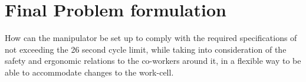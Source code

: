 \chapter{Final Problem formulation} \label{ch:finalprob}
 
 
 How can the manipulator be set up to comply with the required specifications of not exceeding the 26 second cycle limit, while taking into consideration of the safety and ergonomic relations to the co-workers around it, in a flexible way to be able to accommodate changes to the work-cell.
 
 
 
 